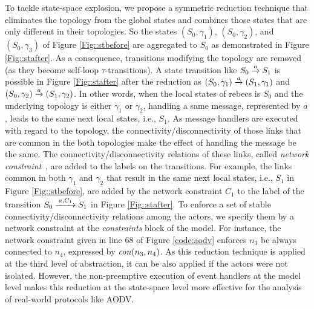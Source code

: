 To tackle state-space explosion, we propose a symmetric reduction technique that eliminates the topology from the global states and combines those states that are only different in their topologies.  So the states $(S_0,\gamma_1)$, $(S_0,\gamma_2)$, and $(S_0,\gamma_3)$ of Figure \ref{Fig::stbefore} are aggregated to $S_0$ as demonstrated in Figure \ref{Fig::stafter}. As a consequence, transitions modifying the topology are removed (as they become self-loop $\tau$-transitions). A state transition like $S_0\overto{a} S_1$ is possible in Figure \ref{Fig::stafter} after the reduction as $(S_0,\gamma_1)\overto{a}(S_1,\gamma_1)$ and $(S_0,\gamma_2)\overto{a}(S_1,\gamma_2)$. In other words, when the local states of rebecs is $S_0$ and the underlying topology is either $\gamma_1$ or $\gamma_2$, handling a same message, represented by $a$, leads to the same next local states, i.e., $S_1$.  As message handlers are executed with regard to the topology, the connectivity/disconnectivity of those links that are common in the both topologies make the effect of handling the message be the same. The connectivity/disconnectivity relations of these links, called \emph{network constraint}~\cite{FatemehFI10,FatemehFI19},  
are added to the labels on the transitions. For example, the links common in both $\gamma_{1}$ and $\gamma_{2}$ that result in the same next local states, i.e., $S_1$ in Figure \ref{Fig::stbefore}, are added by the network constraint $C_1$ to the label of the transition $S_0\overto{a,C_1}S_1$ in Figure \ref{Fig::stafter}. %
To enforce a set of stable connectivity/disconnectivity relations among the actors, we specify them by a network constraint at the \emph{constraints} block of the model. For instance, the network constraint given in line $68$ of Figure \ref{code:aodv} enforces $n_3$ be always connected to $n_4$, expressed by ${\it con}(n_3,n_4)$.  
As this reduction technique is applied at the third level of abstraction, it can be also applied if the actors were not isolated. However, the non-preemptive execution of event handlers at the model level makes this reduction at the state-space level more effective for the analysis of real-world protocols like AODV. 

